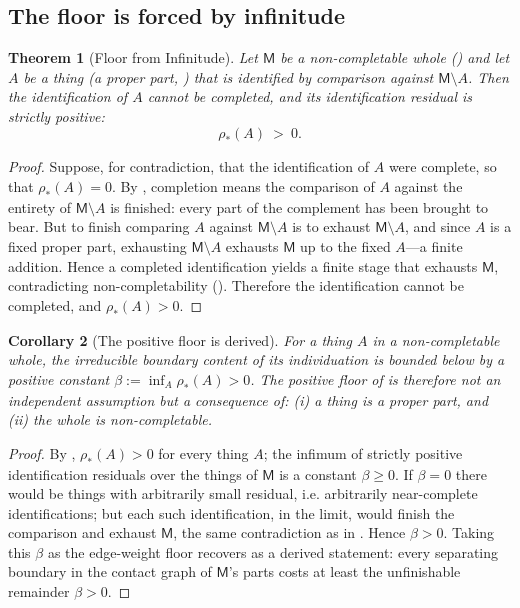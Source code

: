 \documentclass[11pt,a4paper]{article}
\theoremstyle{thmstyle}
\newtheorem{theorem}{Theorem}[section]
\newtheorem{corollary}[theorem]{Corollary}
\theoremstyle{definition}
\theoremstyle{remark}
\newcommand{\floorc}{\beta}               %
\newcommand{\med}{\mathsf{M}}             %
\newcommand{\idres}{\rho_{\!*}}            %
\begin{document}
\subsection{The floor is forced by infinitude}

\begin{theorem}[Floor from Infinitude]
\label{thm:floor-infinitude}
Let $\med$ be a non-completable whole \textup{(}\textup{)}
and let $A$ be a thing \textup{(}a proper part, \textup{)} that is
identified by comparison against $\med\setminus A$. Then the identification of $A$
cannot be completed, and its identification residual is strictly positive:
\[
\boxed{\ \idres(A)\ >\ 0.\ }
\]
\end{theorem}

\begin{proof}
Suppose, for contradiction, that the identification of $A$ were complete, so that
$\idres(A)=0$. By , completion means the comparison of
$A$ against the entirety of $\med\setminus A$ is finished: every part of the
complement has been brought to bear. But to finish comparing $A$ against
$\med\setminus A$ is to exhaust $\med\setminus A$, and since $A$ is a fixed proper
part, exhausting $\med\setminus A$ exhausts $\med$ up to the fixed $A$---a finite
addition. Hence a completed identification yields a finite stage that exhausts
$\med$, contradicting non-completability \textup{(}\textup{)}.
Therefore the identification cannot be completed, and $\idres(A)>0$.
\end{proof}

\begin{corollary}[The positive floor is derived]
\label{cor:floor-derived}
For a thing $A$ in a non-completable whole, the irreducible boundary content of
its individuation is bounded below by a positive constant
$\floorc:=\inf_A\idres(A)>0$. The positive floor of  is therefore
not an independent assumption but a consequence of: \textup{(}i\textup{)} a thing
is a proper part, and \textup{(}ii\textup{)} the whole is non-completable.
\end{corollary}

\begin{proof}
By , $\idres(A)>0$ for every thing $A$; the infimum of
strictly positive identification residuals over the things of $\med$ is a
constant $\floorc\ge0$. If $\floorc=0$ there would be things with arbitrarily
small residual, i.e. arbitrarily near-complete identifications; but each such
identification, in the limit, would finish the comparison and exhaust $\med$, the
same contradiction as in . Hence $\floorc>0$. Taking
this $\floorc$ as the edge-weight floor recovers  as a derived
statement: every separating boundary in the contact graph of $\med$'s parts costs
at least the unfinishable remainder $\floorc>0$.
\end{proof}
\end{document}
